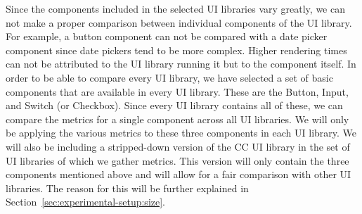 Since the components included in the selected UI libraries vary greatly, we can not make a proper comparison between individual components of the UI library. For example, a button component can not be compared with a date picker component since date pickers tend to be more complex. Higher rendering times can not be attributed to the UI library running it but to the component itself. In order to be able to compare every UI library, we have selected a set of basic components that are available in every UI library. These are the Button, Input, and Switch (or Checkbox). Since every UI library contains all of these, we can compare the metrics for a single component across all UI libraries. We will only be applying the various metrics to these three components in each UI library. We will also be including a stripped-down version of the CC UI library in the set of UI libraries of which we gather metrics. This version will only contain the three components mentioned above and will allow for a fair comparison with other UI libraries. The reason for this will be further explained in Section~\ref{sec:experimental-setup:size}.

